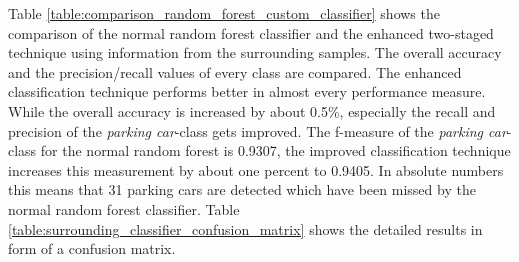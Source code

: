 \begin{table}


\caption{Comparison of the best performing random forest classifier to the best configuration of the proposed two staged classification technique  (two random forests and using 10 surrounding samples) on the filtered dataset.}
\label{table:comparison_random_forest_custom_classifier}
\end{table}
 
 
Table \ref{table:comparison_random_forest_custom_classifier} shows the comparison of the normal random forest classifier and the enhanced two-staged technique using information from the surrounding samples. The overall accuracy and the precision/recall values of every class are compared. The enhanced classification technique performs better in almost every performance measure. While the overall accuracy is increased by about 0.5\%, especially the recall and precision of the \emph{parking car}-class gets improved. The f-measure of the \emph{parking car}-class for the normal random forest is 0.9307, the improved classification technique increases this measurement by about one percent to 0.9405. In absolute numbers this means that 31 parking cars are detected which have been missed by the normal random forest classifier. Table \ref{table:surrounding_classifier_confusion_matrix} shows the detailed results in form of a confusion matrix.


